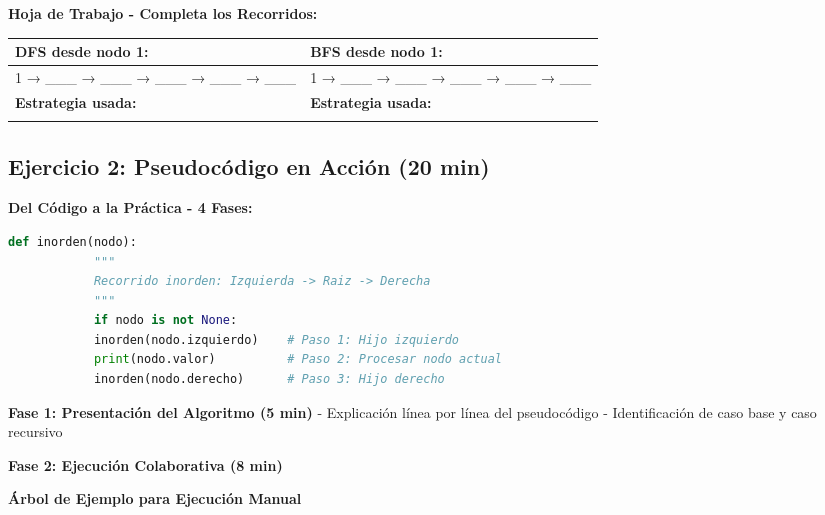 \documentclass[12pt,a4paper]{article}
\begin{document}
	\textbf{Hoja de Trabajo - Completa los Recorridos:}
	
	\begin{center}
		\begin{tabular}{|p{}|p{}|}
			\hline
			\textbf{DFS desde nodo 1:} & \textbf{BFS desde nodo 1:} \\
			\hline
			1 → \_\_\_ → \_\_\_ → \_\_\_ → \_\_\_ → \_\_\_ & 1 → \_\_\_ → \_\_\_ → \_\_\_ → \_\_\_ → \_\_\_ \\
			\hline
			\textbf{Estrategia usada:} & \textbf{Estrategia usada:} \\
			\rule{0pt}{2cm} & \rule{0pt}{2cm} \\
			\hline
		\end{tabular}
	\end{center}
	
	\newpage
	
	\subsection*{Ejercicio 2: Pseudocódigo en Acción (20 min)}
	
	
	\textbf{Del Código a la Práctica - 4 Fases:}
	
	\begin{center}
		\begin{lstlisting}[language=Python, title=Algoritmo Inorden - Para Ejecutar Paso a Paso, frame=single]
			def inorden(nodo):
			"""
			Recorrido inorden: Izquierda -> Raiz -> Derecha
			"""
			if nodo is not None:
			inorden(nodo.izquierdo)    # Paso 1: Hijo izquierdo
			print(nodo.valor)          # Paso 2: Procesar nodo actual  
			inorden(nodo.derecho)      # Paso 3: Hijo derecho
		\end{lstlisting}
	\end{center}
	
	\textbf{Fase 1: Presentación del Algoritmo (5 min)}
	- Explicación línea por línea del pseudocódigo
	- Identificación de caso base y caso recursivo
	
	\textbf{Fase 2: Ejecución Colaborativa (8 min)}
	
	\begin{center}
		\textbf{Árbol de Ejemplo para Ejecución Manual}
	\end{center}
	
	\begin{center}
	\end{center}
	
\end{document}
